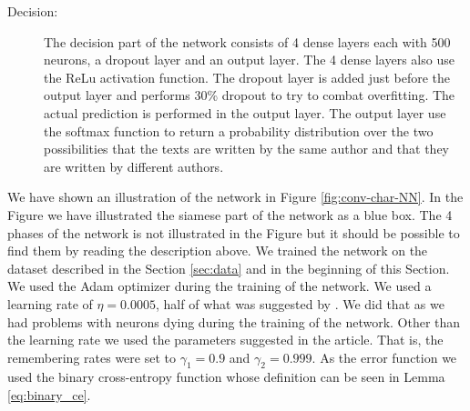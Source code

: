 \begin{description}
    \item[Decision:]

        The decision part of the network consists of 4 dense layers each with
        500 neurons, a dropout layer and an output layer. The 4 dense layers
        also use the \gls{ReLu} activation function. The dropout layer is added
        just before the output layer and performs 30\% dropout to try to combat
        overfitting. The actual prediction is performed in the output layer.
        The output layer use the softmax function to return a probability
        distribution over the two possibilities that the texts are written by
        the same author and that they are written by different authors.

\end{description}

We have shown an illustration of the network in Figure \ref{fig:conv-char-NN}.
In the Figure we have illustrated the siamese part of the network as a blue box.
The 4 phases of the network is not illustrated in the Figure but it should be
possible to find them by reading the description above. We trained the network
on the dataset described in the Section \ref{sec:data} and in the beginning
of this Section. We used the \gls{Adam} optimizer during the training of the
network. We used a learning rate of $\eta = 0.0005$, half of what was suggested
by \citet{DBLP:journals/corr/KingmaB14}. We did that as we had problems with
neurons dying during the training of the network. Other than the learning rate
we used the parameters suggested in the article. That is, the remembering rates
were set to $\gamma_1 = 0.9$ and $\gamma_2 = 0.999$. As the error function we
used the binary cross-entropy function whose definition can be seen in Lemma
\eqref{eq:binary_ce}.

